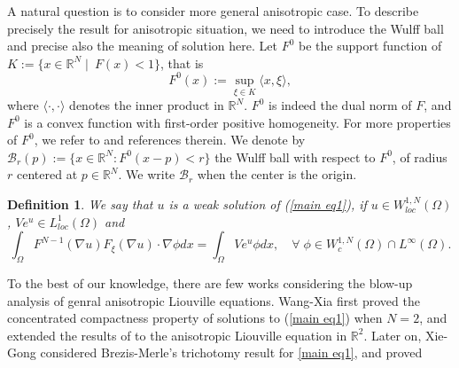 \documentclass[11pt]{amsart}
\numberwithin{equation}{section}
\newtheorem{Def}[thm]{Definition}
\newcommand{\R}{\mathbb{R}}
\begin{document}
\medskip
A natural question is to consider more general anisotropic case. To describe precisely the result for anisotropic situation, we need to introduce the Wulff ball and precise also the meaning of solution here. Let $F^{0}$ be the support function of $K:=\{x\in\mathbb{R}^{N}\mid ~F(x)<1\}$, that is
$$F^{0}(x):=\sup_{\xi\in K} \langle x,\xi\rangle,$$
where $\langle \cdot,\cdot\rangle$ denotes the inner product in $\mathbb{R}^{N}$. $F^{0}$ is indeed the dual norm of $F$, and $F^0$ is a convex function with first-order positive homogeneity. For more properties of $F^{0}$, we refer to \cite{WX2012,XG2016} and references therein. We denote by $\mathcal{B}_{r}(p):=\{x\in\mathbb{R}^{N}: F^{0}(x-p)<r\}$ the Wulff ball with respect to $F^0$, of radius $r$ centered at $p \in \mathbb{R}^N$. We write $\mathcal{B}_{r}$ when the center is the origin.
\begin{Def}
We say that $u$ is a weak solution of (\ref{main eq1}), if $u\in W^{1,N}_{loc}(\Omega)$, $Ve^{u}\in L^{1}_{loc}(\Omega)$ and
$$\int_{\Omega}F^{N-1}(\nabla u)F_{\xi}(\nabla u)\cdot\nabla\phi dx=\int_{\Omega}Ve^{u}\phi dx, \quad \forall\; \phi\in W_{c}^{1, N}(\Omega)\cap L^\infty(\Omega).$$
\end{Def}

To the best of our knowledge, there are  few works considering the blow-up analysis of genral anisotropic Liouville equations. Wang-Xia \cite{WX2012} first proved the concentrated compactness property of  solutions to (\ref{main eq1}) when $N=2$, and extended the results of \cite{BM1991, L1999} to the anisotropic Liouville equation in $\R^2$. Later on, Xie-Gong \cite{XG2016} considered Brezis-Merle's trichotomy result for \eqref{main eq1}, and proved
\end{document}
